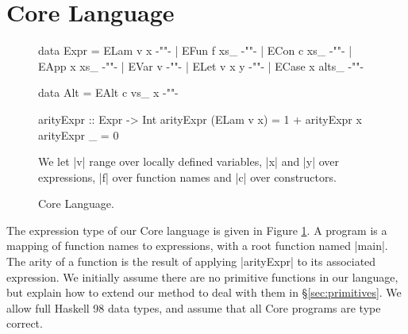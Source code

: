 \documentclass[preprint]{sigplanconf}
\begin{document}
\section{Core Language}
\label{sec:core}

\begin{figure}
\ignore\begin{code}
data Expr  =  ELam v x               {-""-}
           |  EFun f xs_             {-""-}
           |  ECon c xs_             {-""-}
           |  EApp x xs_             {-""-}
           |  EVar v                 {-""-}
           |  ELet v x y             {-""-}
           |  ECase x alts_          {-""-}

data Alt   =  EAlt c vs_ x           {-""-}
\end{code}
\begin{code}
arityExpr :: Expr -> Int
arityExpr (ELam v x) = 1 + arityExpr x
arityExpr _ = 0
\end{code}

We let |v| range over locally defined variables, |x| and |y| over expressions, |f| over function names and |c| over constructors.
\caption{Core Language.}
\label{fig:core}
\end{figure}

The expression type of our Core language is given in Figure \ref{fig:core}. A program is a mapping of function names to expressions, with a root function named |main|. The arity of a function is the result of applying |arityExpr| to its associated expression. We initially assume there are no primitive functions in our language, but explain how to extend our method to deal with them in \S\ref{sec:primitives}. We allow full Haskell 98 data types, and assume that all Core programs are type correct.
\end{document}

